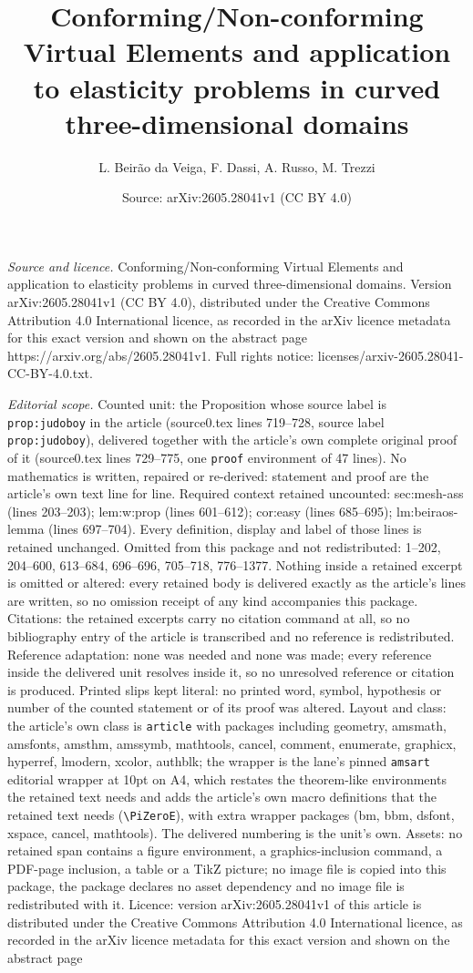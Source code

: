 \documentclass[10pt,a4paper]{amsart}
\title[Conforming/Non-conforming Virtual Elements and application t]{Conforming/Non-conforming Virtual Elements and application to elasticity problems in curved three-dimensional domains}
\author{L. Beir\~ao da Veiga, F. Dassi, A. Russo, M. Trezzi}
\date{Source: arXiv:2605.28041v1 (CC BY 4.0)}
\begin{document}
\maketitle

\noindent\emph{Source and licence.} Conforming/Non-conforming Virtual Elements and application to elasticity problems in curved three-dimensional domains. Version arXiv:2605.28041v1 (CC BY 4.0), distributed under the Creative Commons Attribution 4.0 International licence, as recorded in the arXiv licence metadata for this exact version and shown on the abstract page https://arxiv.org/abs/2605.28041v1. Full rights notice: licenses/arxiv-2605.28041-CC-BY-4.0.txt.\par\smallskip

\noindent\textit{Editorial scope.} Counted unit: the Proposition whose source label is \texttt{prop:judoboy} in the article (source0.tex lines 719--728, source label \texttt{prop:judoboy}), delivered together with the article's own complete original proof of it (source0.tex lines 729--775, one \texttt{proof} environment of 47 lines). No mathematics is written, repaired or re-derived: statement and proof are the article's own text line for line. Required context retained uncounted: sec:mesh-ass (lines 203--203); lem:w:prop (lines 601--612); cor:easy (lines 685--695); lm:beiraos-lemma (lines 697--704). Every definition, display and label of those lines is retained unchanged. Omitted from this package and not redistributed: 1--202, 204--600, 613--684, 696--696, 705--718, 776--1377. Nothing inside a retained excerpt is omitted or altered: every retained body is delivered exactly as the article's lines are written, so no omission receipt of any kind accompanies this package. Citations: the retained excerpts carry no citation command at all, so no bibliography entry of the article is transcribed and no reference is redistributed. Reference adaptation: none was needed and none was made; every reference inside the delivered unit resolves inside it, so no unresolved reference or citation is produced. Printed slips kept literal: no printed word, symbol, hypothesis or number of the counted statement or of its proof was altered. Layout and class: the article's own class is \texttt{article} with packages including geometry, amsmath, amsfonts, amsthm, amssymb, mathtools, cancel, comment, enumerate, graphicx, hyperref, lmodern, xcolor, authblk; the wrapper is the lane's pinned \texttt{amsart} editorial wrapper at 10pt on A4, which restates the theorem-like environments the retained text needs and adds the article's own macro definitions that the retained text needs (\texttt{\textbackslash PiZeroE}), with extra wrapper packages (bm, bbm, dsfont, xspace, cancel, mathtools). The delivered numbering is the unit's own. Assets: no retained span contains a figure environment, a graphics-inclusion command, a PDF-page inclusion, a table or a TikZ picture; no image file is copied into this package, the package declares no asset dependency and no image file is redistributed with it. Licence: version arXiv:2605.28041v1 of this article is distributed under the Creative Commons Attribution 4.0 International licence, as recorded in the arXiv licence metadata for this exact version and shown on the abstract page 
\end{document}
